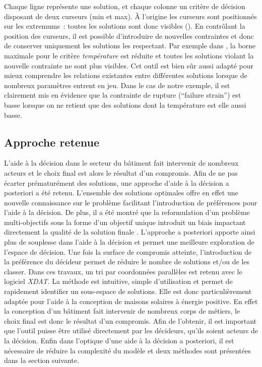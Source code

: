Chaque ligne représente une solution, et chaque colonne un critère de décision disposant de
deux curseurs (min et max). À l’origine les curseurs sont positionnés sur les extremums~:
toutes les solutions sont donc visibles (). En contrôlant la
position des curseurs, il est possible d’introduire de nouvelles contraintes et donc
de conserver uniquement les solutions les respectant. Par exemple dans ,
la borne maximale pour le critère \emph{température} est réduite et toutes les solutions
violant la nouvelle contrainte ne sont plus visibles. Cet outil est bien sûr aussi adapté
pour mieux comprendre les relations existantes entre différentes solutions lorsque de
nombreux paramètres entrent en jeu. Dans le cas de notre exemple, il est clairement mis en
évidence que la contrainte de rupture (\enquote{failure strain}) est basse lorsque on ne
retient que des solutions dont la température est elle aussi basse.


\subsection{Approche retenue} %
\label{sub:approche_retenue}
L’aide à la décision dans le secteur du bâtiment fait intervenir de nombreux acteurs et le
choix final est alors le résultat d’un compromis. Afin de ne pas écarter prématurément des
solutions, une approche d’aide à la décision a posteriori a été retenu. L’ensemble des
solutions optimales offre en effet une nouvelle connaissance sur le problème facilitant
l’introduction de préférences pour l’aide à la décision. De plus, il a été montré que la
reformulation d’un problème multi-objectifs sous la forme d’un objectif unique introduit un
biais impactant directement la qualité de la solution finale \parencite{Blondeau2002165}.
L’approche a posteriori apporte ainsi plus de souplesse dans l’aide à la décision et
permet une meilleure exploration de l’espace de décision.
Une fois la surface de compromis atteinte, l’introduction de la préférence du décideur
permet de réduire le nombre de solutions et/ou de les classer. Dans ces travaux, un tri
par coordonnées parallèles est retenu avec le logiciel \textit{XDAT}. La méthode est intuitive,
simple d’utilisation et permet de rapidement identifier un sous-espace de solutions.
Elle est donc particulièrement adaptée pour l’aide à la conception de maisons solaires
à énergie positive. En effet la conception d’un bâtiment fait intervenir de nombreux
corps de métiers, le choix final est donc le résultat d’un compromis. Afin de l’obtenir,
il est important que l’outil puisse être utilisé directement par les décideurs, qu’ils
soient acteurs de la décision.
Enfin dans l’optique d’une aide à la décision a posteriori, il est nécessaire de réduire la
complexité du modèle et deux méthodes sont présentées dans la section suivante.




